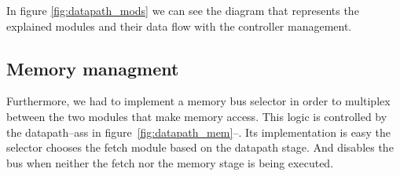 In figure \ref{fig:datapath_mods} we can see the diagram that represents the explained modules and
their data flow with the controller management.

\subsection{Memory managment}

Furthermore, we had to implement a memory bus selector
in order to multiplex between the two modules that make memory access. This
logic is controlled by the datapath--ass in figure~\ref{fig:datapath_mem}--.
Its implementation is easy the selector chooses the fetch module based on the
datapath stage. And disables the bus when neither the fetch nor the memory
stage is being executed.


